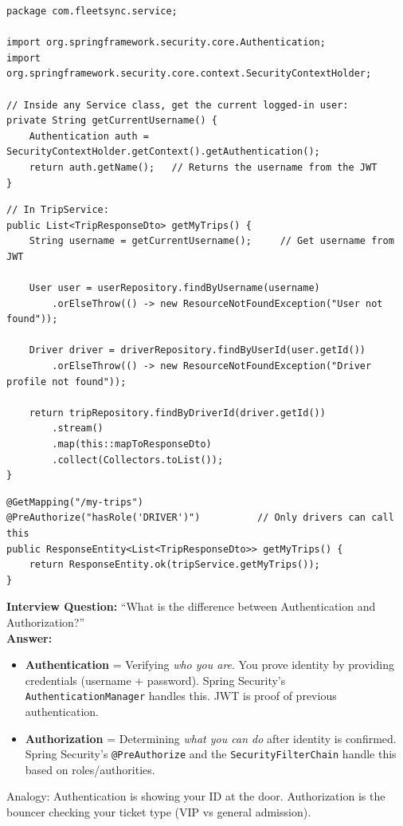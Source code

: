 \documentclass[12pt,a4paper]{report}
\newcommand{\code}[1]{\texttt{\textcolor{keywordblue}{#1}}}
\begin{document}
\begin{lstlisting}[caption=Getting Current Authenticated User in Service]
package com.fleetsync.service;

import org.springframework.security.core.Authentication;
import org.springframework.security.core.context.SecurityContextHolder;

// Inside any Service class, get the current logged-in user:
private String getCurrentUsername() {
    Authentication auth = SecurityContextHolder.getContext().getAuthentication();
    return auth.getName();   // Returns the username from the JWT
}
\end{lstlisting}

\begin{lstlisting}[caption=TripService.java -- Driver sees only own trips]
// In TripService:
public List<TripResponseDto> getMyTrips() {
    String username = getCurrentUsername();     // Get username from JWT

    User user = userRepository.findByUsername(username)
        .orElseThrow(() -> new ResourceNotFoundException("User not found"));

    Driver driver = driverRepository.findByUserId(user.getId())
        .orElseThrow(() -> new ResourceNotFoundException("Driver profile not found"));

    return tripRepository.findByDriverId(driver.getId())
        .stream()
        .map(this::mapToResponseDto)
        .collect(Collectors.toList());
}
\end{lstlisting}

\begin{lstlisting}[caption=TripController.java -- my-trips endpoint]
@GetMapping("/my-trips")
@PreAuthorize("hasRole('DRIVER')")          // Only drivers can call this
public ResponseEntity<List<TripResponseDto>> getMyTrips() {
    return ResponseEntity.ok(tripService.getMyTrips());
}
\end{lstlisting}

\begin{tcolorbox}[interviewbox]
\textbf{Interview Question:} ``What is the difference between Authentication and Authorization?''\\[6pt]
\textbf{Answer:}
\begin{itemize}
  \item \textbf{Authentication} = Verifying \textit{who you are}. You prove identity by providing credentials (username + password). Spring Security's \code{AuthenticationManager} handles this. JWT is proof of previous authentication.
  \item \textbf{Authorization} = Determining \textit{what you can do} after identity is confirmed. Spring Security's \code{@PreAuthorize} and the \code{SecurityFilterChain} handle this based on roles/authorities.
\end{itemize}
Analogy: Authentication is showing your ID at the door. Authorization is the bouncer checking your ticket type (VIP vs general admission).
\end{tcolorbox}
\end{document}
